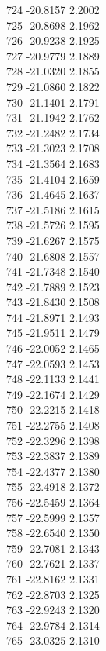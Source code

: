 \documentclass[11pt]{article}
\theoremstyle{definition}
\theoremstyle{plain}
\begin{document}
{724 -20.8157 2.2002\\
725 -20.8698 2.1962\\
726 -20.9238 2.1925\\
727 -20.9779 2.1889\\
728 -21.0320 2.1855\\
729 -21.0860 2.1822\\
730 -21.1401 2.1791\\
731 -21.1942 2.1762\\
732 -21.2482 2.1734\\
733 -21.3023 2.1708\\
734 -21.3564 2.1683\\
735 -21.4104 2.1659\\
736 -21.4645 2.1637\\
737 -21.5186 2.1615\\
738 -21.5726 2.1595\\
739 -21.6267 2.1575\\
740 -21.6808 2.1557\\
741 -21.7348 2.1540\\
742 -21.7889 2.1523\\
743 -21.8430 2.1508\\
744 -21.8971 2.1493\\
745 -21.9511 2.1479\\
746 -22.0052 2.1465\\
747 -22.0593 2.1453\\
748 -22.1133 2.1441\\
749 -22.1674 2.1429\\
750 -22.2215 2.1418\\
751 -22.2755 2.1408\\
752 -22.3296 2.1398\\
753 -22.3837 2.1389\\
754 -22.4377 2.1380\\
755 -22.4918 2.1372\\
756 -22.5459 2.1364\\
757 -22.5999 2.1357\\
758 -22.6540 2.1350\\
759 -22.7081 2.1343\\
760 -22.7621 2.1337\\
761 -22.8162 2.1331\\
762 -22.8703 2.1325\\
763 -22.9243 2.1320\\
764 -22.9784 2.1314\\
765 -23.0325 2.1310\\
}
\end{document}
